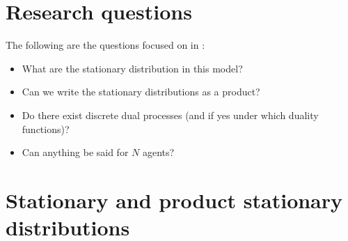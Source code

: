 \documentclass{article}
\begin{document}
\section{Research questions}\label{questions}
The following are the questions focused on in \cite{cirillo2014duality}:
\begin{itemize}
\item What are the stationary distribution in this model?
\item Can we write the stationary distributions as a product?
\item Do there exist discrete dual processes (and if yes under which duality functions)?
\item Can anything be said for $N$ agents?
\end{itemize}







\section{Stationary and product stationary distributions}\label{statprod}
\end{document}
